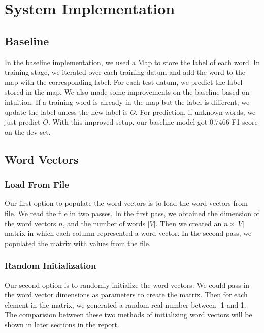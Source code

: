 \documentclass[12pt, twocolumn]{article}
\begin{document}

\section{System Implementation}

\subsection{Baseline}
In the baseline implementation, we used a Map to store the label of each word. In training stage, we iterated over each training datum and add the word to the map with the corresponding label. For each test datum, we predict the label stored in the map. We also made some improvements on the baseline based on intuition: If a training word is already in the map but the label is different, we update the label unless the new label is $O$. For prediction, if unknown words, we just predict $O$. With this improved setup, our baseline model got 0.7466 F1 score on the dev set.
\subsection{Word Vectors}
\subsubsection{Load From File}
Our first option to populate the word vectors is to load the word vectors from file. We read the file in two passes. In the first pass, we obtained the dimension of the word vectors $n$, and the number of words $|V|$. Then we created an ${n}\times{|V|}$ matrix in which each column represented a word vector. In the second pass, we populated the matrix with values from the file.
\subsubsection{Random Initialization}
Our second option is to randomly initialize the word vectors. We could pass in the word vector dimensions as parameters to create the matrix. Then for each element in the matrix, we generated a random real number between -1 and 1.\\
The comparision between these two methods of initializing word vectors will be shown in later sections in the report.
\end{document}
